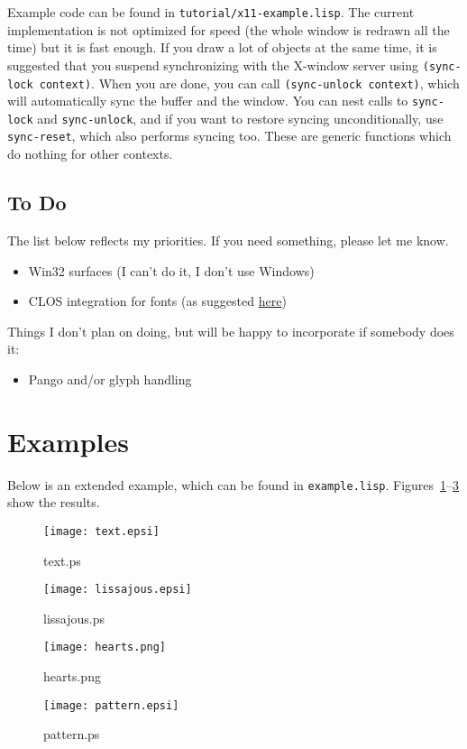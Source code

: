 \documentclass[12pt,letterpaper,dvipdfm]{article}
\begin{document}
Example code can be found in \verb!tutorial/x11-example.lisp!.  The
current implementation is not optimized for speed (the whole window is
redrawn all the time) but it is fast enough.  If you draw a lot of
objects at the same time, it is suggested that you suspend
synchronizing with the X-window server using
 \lstinline!(sync-lock context)!.
  When you are done, you can call \lstinline!(sync-unlock context)!, which will automatically sync the buffer and the window.
You can nest calls to \lstinline!sync-lock!  and
\lstinline!sync-unlock!, and if you want to restore syncing
unconditionally, use \lstinline!sync-reset!, which also performs
syncing too.  These are generic functions which do nothing for other
contexts.



\subsection{To Do}
\label{sec:todo}

The list below reflects my priorities.  If you need something, please
let me know.
\begin{itemize}
\item Win32 surfaces (I can't do it, I don't use Windows)
\item CLOS integration for fonts (as suggested
  \href{http://www.cairographics.org/manual/bindings-fonts.html}{here})
\end{itemize}

Things I don't plan on doing, but will be happy to incorporate if
somebody does it:
\begin{itemize}
\item Pango and/or glyph handling
\end{itemize}


\section{Examples}
\label{sec:examples}

Below is an extended example, which can be found in
\texttt{example.lisp}.  Figures~\ref{fig:text}--\ref{fig:hearts} show
the results.



\begin{figure}[htbp]
  \centering
  \texttt{[image: text.epsi]}
  \caption{text.ps}
  \label{fig:text}
\end{figure}

\begin{figure}[htbp]
  \centering
  \texttt{[image: lissajous.epsi]}
  \caption{lissajous.ps}
  \label{fig:lissajous}
\end{figure}

\begin{figure}[htbp]
  \centering
  \texttt{[image: hearts.png]}
  \caption{hearts.png}
  \label{fig:hearts}
\end{figure}

\begin{figure}[htbp]
  \centering
  \texttt{[image: pattern.epsi]}
  \caption{pattern.ps}
  \label{fig:pattern}
\end{figure}
\end{document}
